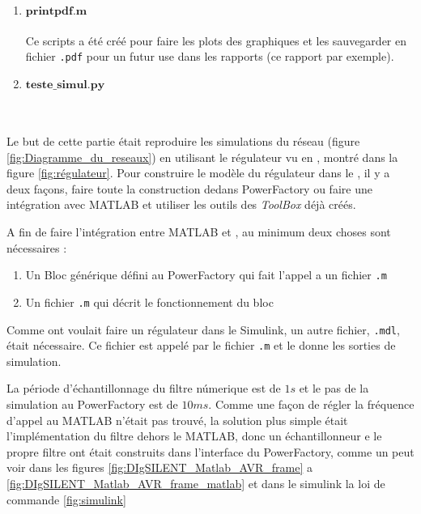 \begin{enumerate}[\bfseries 4.3.1]
	\\
	\item $\mathbf{printpdf.m}$\\
	\\Ce scripts a été créé pour faire les plots des graphiques et les sauvegarder en fichier \verb|.pdf| pour un futur use dans les rapports (ce rapport par exemple). 
	\\
	\item $\mathbf{teste\_simul.py}$\\
	\\
	\\ 
\end{enumerate}

Le but de cette partie était reproduire les simulations du réseau (figure \ref{fig:Diagramme_du_reseaux}) en utilisant le régulateur vu en \cite{cosson:tel-01374469}, montré dans la figure \ref{fig:régulateur}.
Pour construire le modèle du régulateur dans le \powerfactory, il y a deux façons, faire toute la construction dedans PowerFactory ou faire une intégration avec MATLAB et utiliser les outils des \textit{ToolBox} déjà créés.

A fin de faire l'intégration entre MATLAB et \powerfactory, au minimum deux choses sont nécessaires :
\begin{enumerate}
	\item Un Bloc générique défini au PowerFactory qui fait l'appel a un fichier \verb|.m|
	\item Un fichier \verb|.m| qui décrit le fonctionnement du bloc
	
\end{enumerate}

Comme ont voulait faire un régulateur dans le Simulink, un autre fichier, \verb|.mdl|, était nécessaire. Ce fichier est appelé par le fichier \verb|.m| et le donne les sorties de simulation.

La période d'échantillonnage du filtre númerique est de $ 1s $ et le pas de la simulation au PowerFactory est de $ 10ms $. Comme une façon de régler la fréquence d'appel au MATLAB n'était pas trouvé, la solution plus simple était l'implémentation du filtre dehors le MATLAB, donc un échantillonneur e le propre filtre ont était construits dans l'interface du PowerFactory, comme un peut voir dans les figures \ref{fig:DIgSILENT_Matlab_AVR_frame} a \ref{fig:DIgSILENT_Matlab_AVR_frame_matlab} et dans le simulink la loi de commande \ref{fig:simulink}


